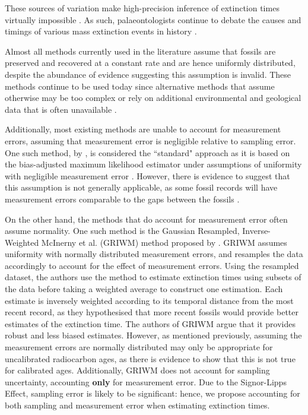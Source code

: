 These sources of variation make high-precision inference of extinction times virtually impossible \cite{Bradshaw2012}. As such, palaeontologists continue to debate the causes and timings of various mass extinction events in history \cite{Saltre2015}.

Almost all methods currently used in the literature assume that fossils are preserved and recovered at a constant rate and are hence uniformly distributed, despite the abundance of evidence suggesting this assumption is invalid. These methods continue to be used today since alternative methods that assume otherwise may be too complex or rely on additional environmental and geological data that is often unavailable \cite{WangMarshall2016}.

Additionally, most existing methods are unable to account for measurement errors, assuming that measurement error is negligible relative to sampling error. One such method, by \citet{Strauss1989}, is considered the ``standard" approach as it is based on the bias-adjusted maximum likelihood estimator under assumptions of uniformity with negligible measurement error \cite{WangMarshall2016}. However, there is evidence to suggest that this assumption is not generally applicable, as some fossil records will have measurement errors comparable to the gaps between the fossils \cite{Solow2006}.

On the other hand, the methods that do account for measurement error often assume normality. One such method is the Gaussian Resampled, Inverse-Weighted McInerny et al. (GRIWM) method proposed by \citet{Bradshaw2012}. GRIWM assumes uniformity with normally distributed measurement errors, and resamples the data accordingly to account for the effect of measurement errors. Using the resampled dataset, the authors use the \citet{Mcinerny2006} method to estimate extinction times using subsets of the data before taking a weighted average to construct one estimation. Each estimate is inversely weighted according to its temporal distance from the most recent record, as they hypothesised that more recent fossils would provide better estimates of the extinction time. The authors of GRIWM argue that it provides robust and less biased estimates. However, as mentioned previously, assuming the measurement errors are normally distributed may only be appropriate for uncalibrated radiocarbon ages, as there is evidence to show that this is not true for calibrated ages. Additionally, GRIWM does not account for sampling uncertainty, accounting \textbf{only} for measurement error. Due to the Signor-Lipps Effect, sampling error is likely to be significant: hence, we propose accounting for both sampling and measurement error when estimating extinction times.

